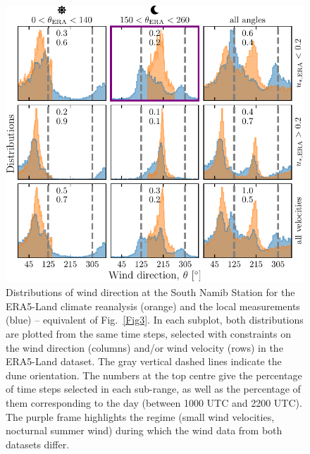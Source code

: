 \begin{figure}[p]
\centering
\includegraphics[scale=1]{Figures/Figure7_supp.pdf}
\caption{Distributions of wind direction at the South Namib Station for the ERA5-Land climate reanalysis (orange) and the local measurements (blue) -- equivalent of Fig.~\ref{Fig3}. In each subplot, both distributions are plotted from the same time steps, selected with constraints on the wind direction (columns) and/or wind velocity (rows) in the ERA5-Land dataset. The gray vertical dashed lines indicate the dune orientation. The numbers at the top centre give the percentage of time steps selected in each sub-range, as well as the percentage of them corresponding to the day (between 1000 UTC and 2200 UTC). The purple frame highlights the regime (small wind velocities, nocturnal summer wind) during which the wind data from both datasets differ.}
\label{Fig7_supp}
\end{figure}

